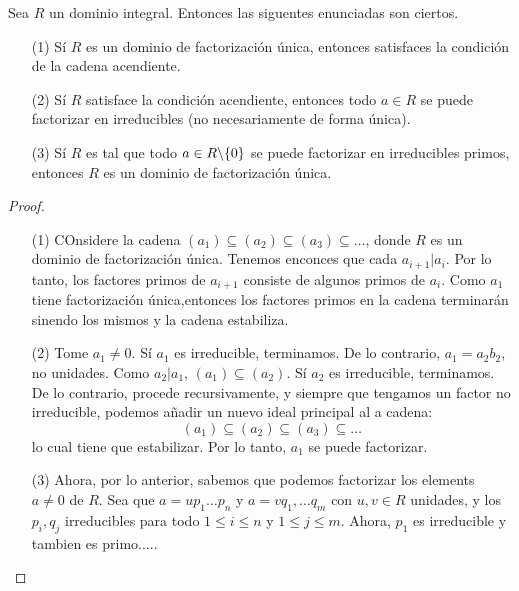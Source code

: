 \begin{theorem}\label{16.69}
    Sea $R$ un dominio integral. Entonces las siguentes enunciadas son ciertos.
    \begin{enumerate}
        \item[(1)] S\'i $R$ es un dominio de factorizaci\'on \'unica, entonces
            satisfaces la condici\'on de la cadena acendiente.

        \item[(2)] S\'i $R$ satisface la condici\'on acendiente, entonces todo
            $a \in R$ se puede factorizar en irreducibles (no necesariamente de
            forma \'unica).

        \item[(3)] S\'i $R$ es tal que todo $a \in R\backslash\{0\}$ se puede
            factorizar en irreducibles primos, entonces $R$ es un dominio de
            factorizaci\'on \'unica.
    \end{enumerate}
\end{theorem}
\begin{proof}
    \begin{enumerate}
        \item[(1)] COnsidere la cadena $(a_1) \subseteq (a_2) \subseteq (a_3)
            \subseteq \dots$, donde $R$ es un dominio de factorizaci\'on
            \'unica. Tenemos enconces que cada  $a_{i+1}|a_i$. Por lo tanto, los
            factores primos de $a_{i+1}$ consiste de algunos primos de $a_i$.
            Como $a_1$ tiene factorizaci\'on \'unica,entonces los factores
            primos en la cadena terminar\'an sinendo los mismos y la cadena
            estabiliza.

        \item[(2)] Tome $a_1 \neq 0$. S\'i $a_1$ es irreducible, terminamos. De
            lo contrario, $a_1=a_2b_2$, no unidades. Como $a_2|a_1$, $(a_1)
            \subseteq (a_2)$. S\'i $a_2$ es irreducible, terminamos. De lo
            contrario, procede recursivamente, y siempre que tengamos un factor
            no irreducible, podemos a\~nadir un nuevo ideal principal al a
            cadena:
            \begin{equation*}
                (a_1) \subseteq (a_2) \subseteq (a_3) \subseteq \dots
            \end{equation*}
            lo cual tiene que estabilizar. Por lo tanto, $a_1$ se puede
            factorizar.

        \item[(3)] Ahora, por lo anterior, sabemos que podemos factorizar los
            elements $a \neq 0$ de  $R$. Sea que $a=up_1 \dots p_n$ y $a=vq_1,
            \dots q_m$ con $u,v \in R$ unidades, y los  $p_i,q_j$ irreducibles
            para todo  $1 \leq i \leq n$ y  $1 \leq j \leq m$. Ahora, $p_1$ es
            irreducible y tambien es primo.....
    \end{enumerate}
\end{proof}

